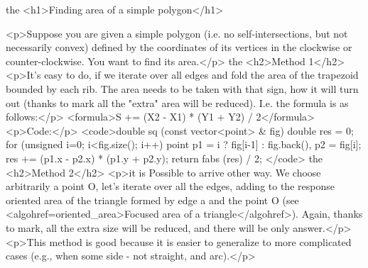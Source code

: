 the <h1>Finding area of a simple polygon</h1>

<p>Suppose you are given a simple polygon (i.e. no self-intersections, but not necessarily convex) defined by the coordinates of its vertices in the clockwise or counter-clockwise. You want to find its area.</p>
the <h2>Method 1</h2>
<p>It's easy to do, if we iterate over all edges and fold the area of the trapezoid bounded by each rib. The area needs to be taken with that sign, how it will turn out (thanks to mark all the "extra" area will be reduced). I.e. the formula is as follows:</p>
<formula>S += (X2 - X1) * (Y1 + Y2) / 2</formula>
<p>Code:</p>
<code>double sq (const vector<point> & fig)
{
double res = 0;
for (unsigned i=0; i<fig.size(); i++)
{
point
p1 = i ? fig[i-1] : fig.back(),
p2 = fig[i];
res += (p1.x - p2.x) * (p1.y + p2.y);
}
return fabs (res) / 2;
}</code>
the <h2>Method 2</h2>
<p>it is Possible to arrive other way. We choose arbitrarily a point O, let's iterate over all the edges, adding to the response oriented area of the triangle formed by edge a and the point O (see <algohref=oriented_area>Focused area of a triangle</algohref>). Again, thanks to mark, all the extra size will be reduced, and there will be only answer.</p>
<p>This method is good because it is easier to generalize to more complicated cases (e.g., when some side - not straight, and arc).</p>